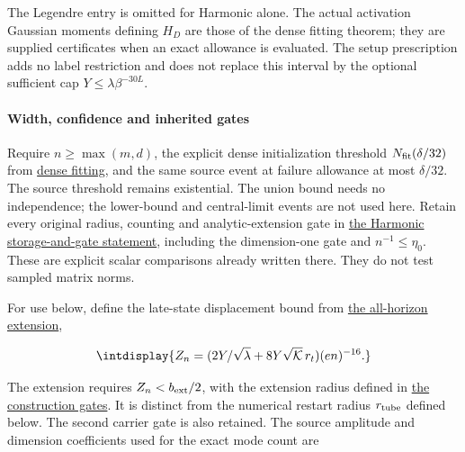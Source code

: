 
The Legendre entry is omitted for Harmonic alone. The actual activation Gaussian moments defining \(H_D\) are those of the dense fitting theorem; they are supplied certificates when an exact allowance is evaluated. The setup prescription adds no label restriction and does not replace this interval by the optional sufficient cap \(Y\le\lambda\beta^{-30L}\).


\paragraph{Width, confidence and inherited gates}
\label{int:setup-orders-detail-4}
\mbox{}\par\smallskip


Require \(n\ge\max(m,\allowbreak d)\), the explicit dense initialization threshold \(N_{\rm fit}(\delta/32)\) from \hyperref[int:dense-fitting]{dense fitting}, and the same source event at failure allowance at most \(\delta/32\). The source threshold remains existential. The union bound needs no independence; the lower-bound and central-limit events are not used here. Retain every original radius, counting and analytic-extension gate in \hyperref[int:harmonic-storage-count]{the Harmonic storage-and-gate statement}, including the dimension-one gate and \(n^{-1}\le\eta_0\). These are explicit scalar comparisons already written there. They do not test sampled matrix norms.



For use below, define the late-state displacement bound from \hyperref[int:harmonic-analytic-extension-proof]{the all-horizon extension},


\begingroup\renewcommand{\theHequation}{intdisplay.237}
\begin{equation*}
\intdisplay{
Z_n=(2Y/\sqrt\lambda+8Y\sqrt{\mathcal K}\,r_t)(en)^{-16}.
}
\end{equation*}
\endgroup


The extension requires \(Z_n<b_{\rm ext}/2\), with the extension radius defined in \hyperref[int:harmonic-storage-count]{the construction gates}. It is distinct from the numerical restart radius \(r_{\rm tube}\) defined below. The second carrier gate is also retained. The source amplitude and dimension coefficients used for the exact mode count are


